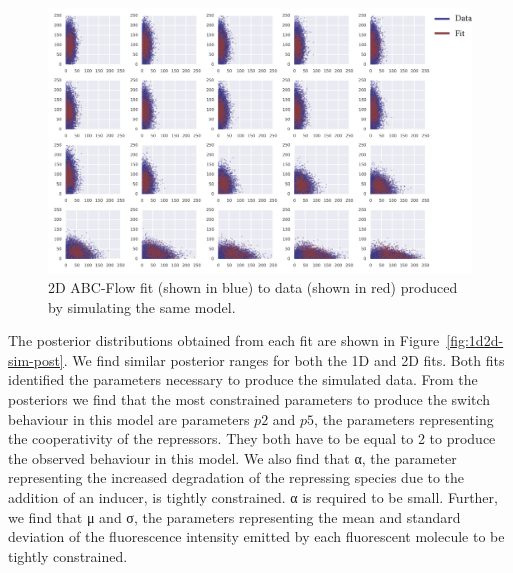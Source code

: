 \begin{figure}[htbp]
\centering
\includegraphics[scale=0.7]{../../chapters/chapterABCFlow/images/2D_toy_e3.png}
\caption[LoF caption]{\label{fig:2d-sim-res}2D ABC-Flow fit (shown in blue) to data (shown in red) produced by simulating the same model. }
\end{figure}

%
%
%
%





The posterior distributions obtained from each fit are shown in Figure~\ref{fig:1d2d-sim-post}. We find similar posterior ranges for both the 1D and 2D fits. Both fits identified the parameters necessary to produce the simulated data. From the posteriors we find that the most constrained parameters to produce the switch behaviour in this model are parameters $p2$ and $p5$, the parameters representing the cooperativity of the repressors. They both have to be equal to 2 to produce the observed behaviour in this model. We also find that α, the parameter representing the increased degradation of the repressing species due to the addition of an inducer, is tightly constrained. α is required to be small. Further, we find that μ and σ, the parameters representing the mean and standard deviation of the fluorescence intensity emitted by each fluorescent molecule to be tightly constrained. 

